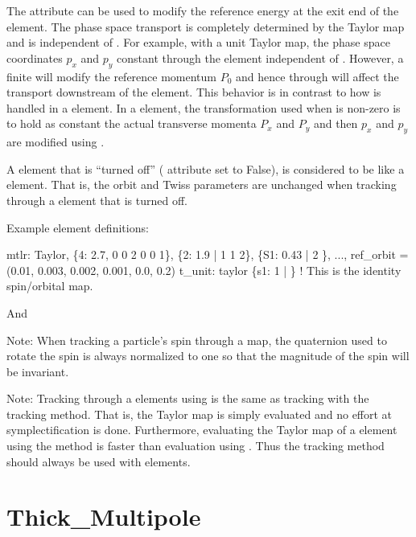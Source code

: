 {The  attribute can be used to modify the reference energy at the exit end of the
 element. The phase space transport is completely determined by the Taylor map and is
independent of . For example, with a unit Taylor map, the phase space coordinates
$p_x$ and $p_y$ constant through the element independent of . However, a finite
 will modify the reference momentum $P_0$ and hence through  will affect the
transport downstream of the  element. This behavior is in contrast to how
 is handled in a  element. In a  element, the transformation
used when  is non-zero is to hold as constant the actual transverse momenta $P_x$
and $P_y$ and then $p_x$ and $p_y$ are modified using .

A  element that is ``turned off'' ( attribute set to False), is
considered to be like a  element. That is, the orbit and Twiss parameters are
unchanged when tracking through a  element that is turned off.

Example  element definitions:
\begin{example}
  mtlr: Taylor, \{4:  2.7, 0 0 2 0 0 1\}, \{2:  1.9 | 1 1 2\},
              \{S1: 0.43 | 2 \}, ..., 
              ref_orbit = (0.01, 0.003, 0.002, 0.001, 0.0, 0.2)
  t_unit: taylor \{s1: 1 | \}  ! This is the identity spin/orbital map.
\end{example}
And 

Note: When tracking a particle's spin through a map, the quaternion used to rotate the spin is
always normalized to one so that the magnitude of the spin will be invariant. 

Note: Tracking through a  elements using  is the same as
tracking with the  tracking method.  That is, the Taylor map is simply
evaluated and no effort at symplectification is done. Furthermore, evaluating the Taylor
map of a  element using the  method is faster than evaluation using
. Thus the  tracking method should always be used with
 elements.

\newpage

\section{Thick_Multipole}
\label{s:thick.mult}

}

